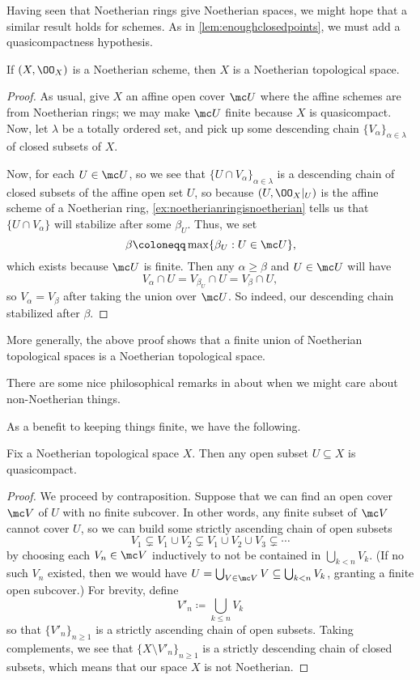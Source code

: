\documentclass[../notes.tex]{subfiles}
\begin{document}
Having seen that Noetherian rings give Noetherian spaces, we might hope that a similar result holds for schemes. As in \autoref{lem:enoughclosedpoints}, we must add a quasicompactness hypothesis.
\begin{lemma} \label{lem:noetherianspace}
	If $(X,\OO_X)$ is a Noetherian scheme, then $X$ is a Noetherian topological space.
\end{lemma}
\begin{proof}
	As usual, give $X$ an affine open cover $\mc U$ where the affine schemes are from Noetherian rings; we may make $\mc U$ finite because $X$ is quasicompact. Now, let $\lambda$ be a totally ordered set, and pick up some descending chain $\{V_\alpha\}_{\alpha\in\lambda}$ of closed subsets of $X$.

	Now, for each $U\in\mc U$, so we see that $\{U\cap V_\alpha\}_{\alpha\in\lambda}$ is a descending chain of closed subsets of the affine open set $U$, so because $(U,\OO_X|_U)$ is the affine scheme of a Noetherian ring, \autoref{ex:noetherianringisnoetherian} tells us that $\{U\cap V_\alpha\}$ will stabilize after some $\beta_U$. Thus, we set
	\[\beta\coloneqq\max\{\beta_U:U\in\mc U\},\]
	which exists because $\mc U$ is finite. Then any $\alpha\ge\beta$ and $U\in\mc U$ will have
	\[V_\alpha\cap U=V_{\beta_U}\cap U=V_\beta\cap U,\]
	so $V_\alpha=V_\beta$ after taking the union over $\mc U$. So indeed, our descending chain stabilized after $\beta$.
\end{proof}
\begin{remark}
	More generally, the above proof shows that a finite union of Noetherian topological spaces is a Noetherian topological space.
\end{remark}
\begin{remark}
	There are some nice philosophical remarks in \cite[Section~3.6.21]{rising-sea} about when we might care about non-Noetherian things.
\end{remark}
As a benefit to keeping things finite, we have the following.
\begin{lemma} \label{lem:opensarecompact}
	Fix a Noetherian topological space $X$. Then any open subset $U\subseteq X$ is quasicompact.
\end{lemma}
\begin{proof}
	We proceed by contraposition. Suppose that we can find an open cover $\mc V$ of $U$ with no finite subcover. In other words, any finite subset of $\mc V$ cannot cover $U$, so we can build some strictly ascending chain of open subsets
	\[V_1\subsetneq V_1\cup V_2\subsetneq V_1\cup V_2\cup V_3\subsetneq\cdots\]
	by choosing each $V_n\in\mc V$ inductively to not be contained in $\bigcup_{k<n}V_k$. (If no such $V_n$ existed, then we would have $U=\bigcup_{V\in\mc V}V\subseteq\bigcup_{k<n}V_k$, granting a finite open subcover.) For brevity, define
	\[V'_n\coloneqq\bigcup_{k\le n}V_k\]
	so that $\{V'_n\}_{n\ge1}$ is a strictly ascending chain of open subsets. Taking complements, we see that $\{X\setminus V'_n\}_{n\ge1}$ is a strictly descending chain of closed subsets, which means that our space $X$ is not Noetherian.
\end{proof}
\end{document}
